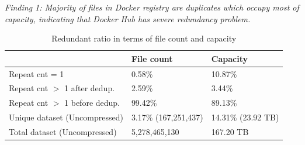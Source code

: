 \textit{Finding 1: Majority of files in Docker registry are duplicates which
occupy most of capacity, indicating that Docker Hub has severe redundancy
problem.}


\begin{table} \centering \scriptsize  
	\caption{Redundant ratio in terms of file count and capacity}
\label{tbl:overall-redundant_ratio} \begin{tabular}{|l|l|l|}%
\hline  & File count & Capacity \\ \hline Repeat cnt = 1 & 0.58\% & 10.87\%\\
\hline Repeat cnt $>$ 1 after dedup. & 2.59\% & 3.44\%\\ \hline Repeat cnt $>$
1 before dedup.  & 99.42\%  & 89.13\%\\ \hline Unique dataset (Uncompressed) &
3.17\% (167,251,437)  &  14.31\% (23.92 TB) \\ \hline Total dataset
(Uncompressed) & 5,278,465,130 & 167.20 TB \\ \hline 	
	\end{tabular} \end{table} 


